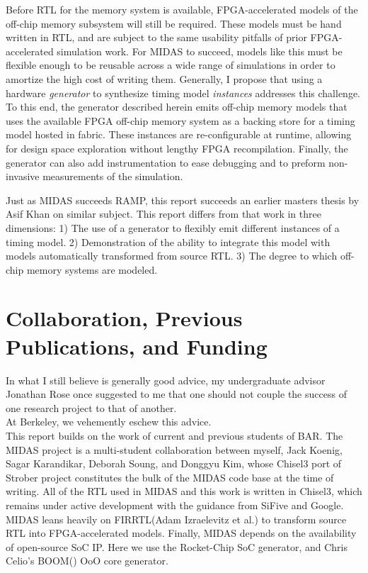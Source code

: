 Before RTL for the memory system is available, FPGA-accelerated models of the
off-chip memory subsystem will still be required. These models must be hand
written in RTL, and are subject to the same usability pitfalls of prior
FPGA-accelerated simulation work. For MIDAS to succeed, models like this must
be flexible enough to be reusable across a wide range of simulations in order
to amortize the high cost of writing them. Generally, I propose that using a
hardware \emph{generator} to synthesize timing model \emph{instances} addresses
this challenge. To this end, the generator described herein emits off-chip
memory models that uses the available FPGA off-chip memory system as a backing
store for a timing model hosted in fabric. These instances are re-configurable
at runtime, allowing for design space exploration without lengthy FPGA
recompilation. Finally, the generator can also add instrumentation to ease
debugging and to preform non-invasive measurements of the simulation.

Just as MIDAS succeeds RAMP, this report succeeds an earlier masters thesis by
Asif Khan\cite{khanmasters} on similar subject. This report differs from that
work in three dimensions: 1) The use of a generator to flexibly emit different
instances of a timing model. 2) Demonstration of the ability to integrate this
model with models automatically transformed from source RTL. 3) The degree to
which off-chip memory systems are modeled.

\section{Collaboration, Previous Publications, and Funding}

In what I still believe is generally good advice, my undergraduate advisor
Jonathan Rose once suggested to me that one should not couple the success of
one research project to that of another.\\

At Berkeley, we vehemently eschew this advice.\\

This report builds on the work of current and previous students of BAR.  The
MIDAS project is a multi-student collaboration between myself, Jack Koenig,
Sagar Karandikar, Deborah Soung, and Donggyu Kim, whose Chisel3 port of
Strober\cite{strober} project constitutes the bulk of the MIDAS code base at
the time of writing. All of the RTL used in MIDAS and this work is written in
Chisel3\cite{chisel}, which remains under active development with the guidance
from SiFive and Google. MIDAS leans heavily on FIRRTL\cite{firrtl}(Adam
Izraelevitz et al.) to transform source RTL into FPGA-accelerated models.
Finally, MIDAS depends on the availability of open-source SoC IP. Here we use
the Rocket-Chip\cite{rocketchip} SoC generator, and Chris Celio's
BOOM(\cite{boom}) OoO core generator.

